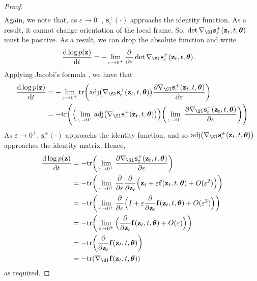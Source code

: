 \documentclass[10pt]{article}
\newcommand{\dee}{\mathrm{d}}
\newcommand{\ve}[1]{\mathbf{#1}}
\newcommand{\mrm}[1]{\mathrm{#1}}
\newcommand{\ves}[1]{\boldsymbol{#1}}
\newcommand{\tr}{\mathrm{tr}}
\begin{document}
\begin{itemize}
\begin{proof}
\begin{align*}
    \end{align*}
  Again, we note that, as $\varepsilon \rightarrow 0^+$, $\ve{s}_\varepsilon^+(\cdot)$ approachs the identity function. As a result, it cannot change orientation of the local frame. So, $\det \nabla_{\S1} \ve{s}_\varepsilon^+(\ve{z}_t, t, \ves{\theta})$ must be positive. As a result, we can drop the absolute function and write
  \begin{align*}
    \frac{\dee \log p(\ve{z})}{\dee t} 
    &= -\lim_{\varepsilon \rightarrow 0^+} \frac{\partial}{\partial \varepsilon} \det \nabla_{\S1} \ve{s}_\varepsilon^+(\ve{z}_t, t, \ves{\theta}).
  \end{align*}
  Applying Jacobi's formula \cite{JacobisFormula}, we have that
  \begin{align*}
    \frac{\dee \log p(\ve{z})}{\dee t} 
    &= - \lim_{\varepsilon \rightarrow 0^+} 
    \tr \bigg( \mrm{adj}\big( \nabla_{\S1} \ve{s}_\varepsilon^+(\ve{z}_t, t, \ves{\theta}) \big) \frac{\partial \nabla_{\S1} \ve{s}_\varepsilon^+(\ve{z}_t, t, \ves{\theta}) }{\partial \varepsilon} \bigg) \\
    &= - \tr \Bigg( 
      \Big( \lim_{\varepsilon \rightarrow 0^+} \mrm{adj}\big( \nabla_{\S1} \ve{s}_\varepsilon^+(\ve{z}_t, t, \ves{\theta}) \big) \Big)
      \bigg( \lim_{\varepsilon \rightarrow 0^+} \frac{\partial \nabla_{\S1} \ve{s}_\varepsilon^+(\ve{z}_t, t, \ves{\theta}) }{\partial \varepsilon} \bigg)
    \Bigg)
  \end{align*}
  As $\varepsilon \rightarrow 0^+$, $\ve{s}_\varepsilon^+(\cdot)$ approachs the identity function, and so $\mrm{adj}\big( \nabla_{\S1} \ve{s}_\varepsilon^+(\ve{z}_t, t, \ves{\theta}) \big)$ approaches the identity matrix. Hence, 
  \begin{align*}
    \frac{\dee \log p(\ve{z})}{\dee t} 
    &= - \tr \bigg( 
      \lim_{\varepsilon \rightarrow 0^+} \frac{\partial \nabla_{\S1} \ve{s}_\varepsilon^+(\ve{z}_t, t, \ves{\theta}) }{\partial \varepsilon} 
    \bigg) \\
    &= - \tr \bigg( 
      \lim_{\varepsilon \rightarrow 0^+} \frac{\partial }{\partial \varepsilon} \frac{\partial}{\partial \ve{z}_t}
      \Big( 
        \ve{z}_t + \varepsilon \ve{f}(\ve{z}_t, t, \ves{\theta}) + O(\varepsilon^2)
      \Big) 
    \bigg) \\
    &= - \tr \bigg( 
      \lim_{\varepsilon \rightarrow 0^+} \frac{\partial }{\partial \varepsilon} 
      \Big( 
        I + \varepsilon \frac{\partial}{\partial \ve{z}_t} \ve{f}(\ve{z}_t, t, \ves{\theta}) + O(\varepsilon^2)
      \Big) 
    \bigg) \\
    &= - \tr \bigg( 
      \lim_{\varepsilon \rightarrow 0^+} 
      \Big( 
        \frac{\partial}{\partial \ve{z}_t} \ve{f}(\ve{z}_t, t, \ves{\theta}) + O(\varepsilon)
      \Big) 
    \bigg) \\
    &= - \tr \bigg( 
        \frac{\partial}{\partial \ve{z}_t} \ve{f}(\ve{z}_t, t, \ves{\theta})
    \bigg) \\
    &= - \tr(\nabla_{\S1}  \ve{f}(\ve{z}_t, t, \ves{\theta}) )
  \end{align*}  
  as required.
  \end{proof}


\end{itemize}
\end{document}
